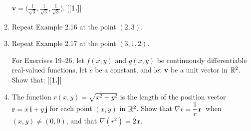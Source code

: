 \begin{enumerate}[\bfseries 1.]
 $\textbf{v} = \biggl( \frac{1}{\sqrt{3}},\frac{1}{\sqrt{3}},\frac{1}{\sqrt{3}} \biggr)$.
 [{[\bfseries 1.]}]
  \item Repeat Example 2.16 at the point $(2,3)$.
  \item Repeat Example 2.17 at the point $(3,1,2)$.
\par\noindent For Exercises 19--26, let $f(x,y)$ and $g(x,y)$ be continuously differentiable
real-valued functions, let $c$ be a constant, and let \textbf{v} be a unit vector in $\mathbb{R}^{2}$. Show that:
[{[\bfseries 1.]}]
 \item The function $r(x,y) = \sqrt{x^2 + y^2}$ is the length of the position vector
  $\textbf{r}=x\,\textbf{i} + y\,\textbf{j}$ for each point $(x,y)$ in $\mathbb{R}^{2}$. Show that
  $\nabla r = \dfrac{1}{r}\,\textbf{r}~$ when $(x,y) \ne (0,0)$, and that $\nabla (r^2 ) = 2\,\textbf{r}$.
\end{enumerate}
\newpage
